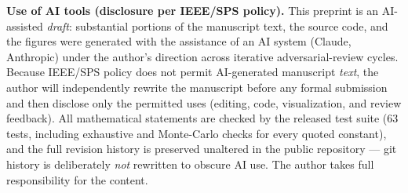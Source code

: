 \documentclass{article}
\begin{document}
\smallskip
\noindent\textbf{Use of AI tools (disclosure per IEEE/SPS policy).}
This preprint is an AI-assisted \emph{draft}: substantial portions of the
manuscript text, the source code, and the figures were generated with the
assistance of an AI system (Claude, Anthropic) under the author's direction
across iterative adversarial-review cycles. Because IEEE/SPS policy does not
permit AI-generated manuscript \emph{text}, the author will independently
rewrite the manuscript before any formal submission and then disclose only
the permitted uses (editing, code, visualization, and review feedback). All
mathematical statements are checked by the released test suite (63 tests,
including exhaustive and Monte-Carlo checks for every quoted constant), and
the full revision history is preserved unaltered in the public repository ---
git history is deliberately \emph{not} rewritten to obscure AI use. The
author takes full responsibility for the content.
\end{document}
